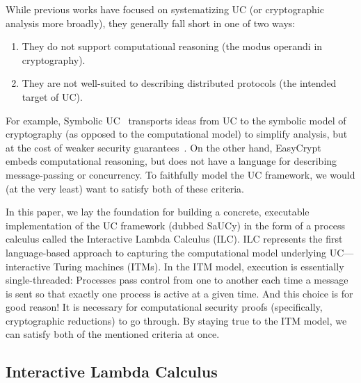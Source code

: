 While previous works have focused on systematizing UC (or cryptographic analysis
more broadly), they generally fall short in one of two ways:
\begin{enumerate}[leftmargin=*]
  \item They do not support computational reasoning (the modus operandi in
    cryptography).
  \item They are not well-suited to describing distributed protocols (the
    intended target of UC).
\end{enumerate}
For example, Symbolic UC~\cite{bohl2016symbolic} transports ideas from UC to the
symbolic model of cryptography (as opposed to the computational model) to
simplify analysis, but at the cost of weaker security
guarantees~\cite{cortier2011survey}. On the other hand,
EasyCrypt~\cite{barthe2011computer} embeds computational reasoning, but does not
have a language for describing message-passing or concurrency. To faithfully
model the UC framework, we would (at the very least) want to satisfy both of
these criteria.

In this paper, we lay the foundation for building a concrete, executable
implementation of the UC framework (dubbed SaUCy) in the form of a process
calculus called the Interactive Lambda Calculus (ILC). ILC represents the first
language-based approach to capturing the computational model underlying
UC---interactive Turing machines (ITMs). In the ITM model, execution is
essentially single-threaded: Processes pass control from one to another each
time a message is sent so that exactly one process is active at a given
time. And this choice is for good reason! It is necessary for computational
security proofs (specifically, cryptographic reductions) to go through. By
staying true to the ITM model, we can satisfy both of the mentioned criteria at
once.


\subsection{Interactive Lambda Calculus}

